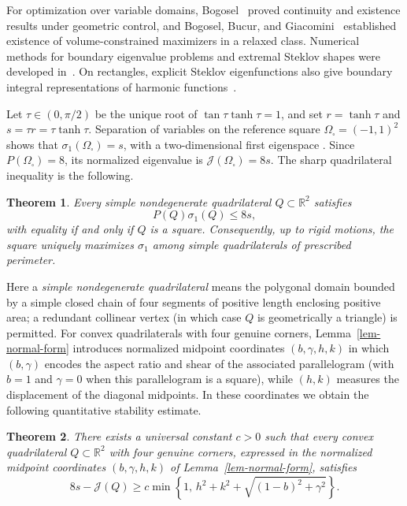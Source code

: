 \documentclass[11pt]{amsart}
\newtheorem{theorem}{Theorem}[section]
\theoremstyle{remark}\newtheorem{remark}[theorem]{Remark}
\numberwithin{equation}{section}
\begin{document}
For optimization over variable domains, Bogosel~\cite{Bogosel2017}
proved continuity and existence results under geometric control, and
Bogosel, Bucur, and Giacomini~\cite{BogoselBucurGiacomini2017} established
existence of volume-constrained maximizers in a relaxed class.
Numerical methods for boundary eigenvalue problems and extremal Steklov
shapes were developed in~\cite{Bogosel2016,AkhmetgaliyevEtAl2017}.
On rectangles, explicit Steklov eigenfunctions also give boundary
integral representations of harmonic functions~\cite{AuchmutyCho2015}.

Let $\tau\in(0,\pi/2)$ be the unique root of $\tan\tau\tanh\tau=1$, and set $r=\tanh\tau$ and $s=\tau r=\tau\tanh\tau$. Separation of variables on the reference square $\Omega_\square=(-1,1)^2$ shows that $\sigma_1(\Omega_\square)=s$, with a two-dimensional first eigenspace \cite{Tan2017,GirouardEtAl2019}. Since $P(\Omega_\square)=8$, its normalized eigenvalue is $\mathcal J(\Omega_\square)=8s$. The sharp quadrilateral inequality is the following.

\begin{theorem}\label{thm-main}
Every simple nondegenerate quadrilateral $Q\subset\mathbb R^2$ satisfies
\[
P(Q)\sigma_1(Q)\le 8s,
\]
with equality if and only if $Q$ is a square. Consequently, up to rigid motions, the square uniquely maximizes $\sigma_1$ among simple quadrilaterals of prescribed perimeter.
\end{theorem}

Here a \emph{simple nondegenerate quadrilateral} means the polygonal domain bounded by a simple closed chain of four segments of positive length enclosing positive area; a redundant collinear vertex (in which case $Q$ is geometrically a triangle) is permitted. For convex quadrilaterals with four genuine corners, Lemma~\ref{lem-normal-form} introduces normalized midpoint coordinates $(b,\gamma,h,k)$ in which $(b,\gamma)$ encodes the aspect ratio and shear of the associated parallelogram (with $b=1$ and $\gamma=0$ when this parallelogram is a square), while $(h,k)$ measures the displacement of the diagonal midpoints. In these coordinates we obtain the following quantitative stability estimate.

\begin{samepage}
\begin{theorem}\label{thm-stability}
There exists a universal constant $c>0$ such that every convex quadrilateral $Q\subset\mathbb R^2$ with four genuine corners, expressed in the normalized midpoint coordinates $(b,\gamma,h,k)$ of Lemma~\ref{lem-normal-form}, satisfies
\[
8s-\mathcal J(Q)\ge c\min\left\{1,\,
h^2+k^2+\sqrt{(1-b)^2+\gamma^2}\right\}.
\]
\end{theorem}
\end{samepage}
\end{document}
